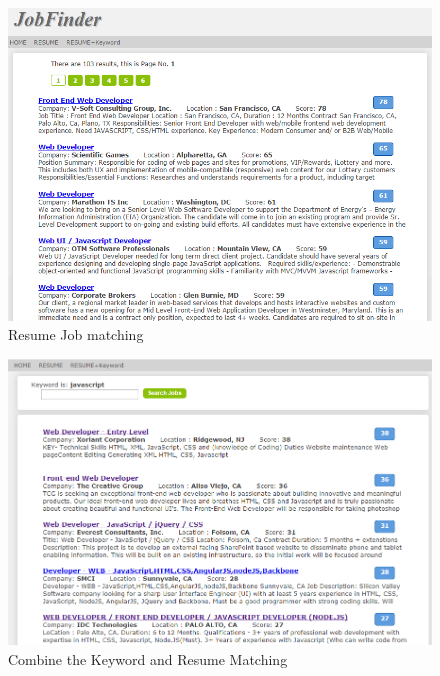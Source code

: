 \begin{figure}[htbp]
  \centering
  \includegraphics[scale=0.5]{images/match_resume.png}
  \caption{Resume Job matching }
  \label{fig:match_resume}
\end{figure}

\begin{figure}[htbp]
  \centering
  \includegraphics[scale=0.5]{images/keyword_resume.png}
  \caption{Combine the Keyword and Resume Matching}
  \label{fig:keyword_resume}
\end{figure}






